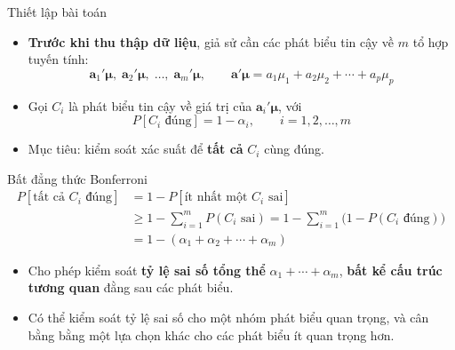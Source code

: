 \begin{frame}{Thiết lập bài toán}
  \begin{itemize}
    \item \textbf{Trước khi thu thập dữ liệu}, giả sử cần các phát biểu tin cậy về $m$ tổ hợp tuyến tính:
    \[
      \mathbf{a}_1'\boldsymbol{\mu},\; \mathbf{a}_2'\boldsymbol{\mu},\; \ldots,\; \mathbf{a}_m'\boldsymbol{\mu},
      \qquad \mathbf{a}'\boldsymbol{\mu} = a_1\mu_1 + a_2\mu_2 + \cdots + a_p\mu_p
    \]
    \item Gọi $C_i$ là phát biểu tin cậy về giá trị của $\mathbf{a}_i'\boldsymbol{\mu}$, với
    \[
      P[C_i \text{ đúng}] = 1-\alpha_i, \qquad i = 1,2,\ldots,m
    \]
    \item Mục tiêu: kiểm soát xác suất để \textbf{tất cả} $C_i$ cùng đúng.
  \end{itemize}
\end{frame}
 
\begin{frame}{Bất đẳng thức Bonferroni }
  \small
  \setlength{\abovedisplayskip}{2pt}
  \setlength{\belowdisplayskip}{2pt}
  \begin{align*}
    P[\text{tất cả } C_i \text{ đúng}] &= 1 - P[\text{ít nhất một } C_i \text{ sai}] \\
    &\ge 1 - \sum_{i=1}^m P(C_i \text{ sai}) = 1 - \sum_{i=1}^m \bigl(1 - P(C_i \text{ đúng})\bigr) \\
    &= 1 - (\alpha_1 + \alpha_2 + \cdots + \alpha_m) \tag{5-28}
  \end{align*}
  \footnotesize
  \begin{itemize}
    \item Cho phép kiểm soát \textbf{tỷ lệ sai số tổng thể} $\alpha_1+\cdots+\alpha_m$, \textbf{bất kể cấu trúc tương quan} đằng sau các phát biểu.
    \item Có thể kiểm soát tỷ lệ sai số cho một nhóm phát biểu quan trọng, và cân bằng bằng một lựa chọn khác cho các phát biểu ít quan trọng hơn.
  \end{itemize}
\end{frame}
 
